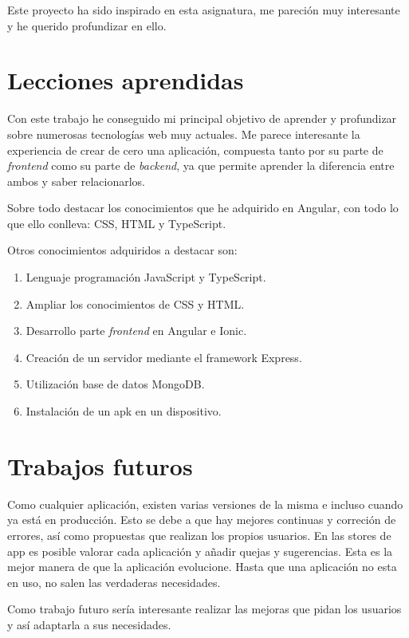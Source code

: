 \documentclass[a4paper, 12pt]{book}
\begin{document}
Este proyecto ha sido inspirado en esta asignatura, me pareci\'on muy interesante y he querido profundizar en ello.


\section{Lecciones aprendidas}
\label{sec:lecciones_aprendidas}

Con este trabajo he conseguido mi principal objetivo de aprender y profundizar sobre numerosas tecnolog\'ias web muy actuales. Me parece interesante la experiencia de crear de cero una aplicaci\'on, compuesta tanto por su parte de \emph{frontend} como su parte de \emph{backend}, ya que permite aprender la diferencia entre ambos y saber relacionarlos.

Sobre todo destacar los conocimientos que he adquirido en Angular, con todo lo que ello conlleva: CSS, HTML y TypeScript.

Otros conocimientos adquiridos a destacar son:

\begin{enumerate}
  \item Lenguaje programaci\'on JavaScript y TypeScript.
  \item Ampliar los conocimientos de CSS y HTML.
  \item Desarrollo parte \emph{frontend} en Angular e Ionic.
  \item Creaci\'on de un servidor mediante el framework Express.
  \item Utilizaci\'on base de datos MongoDB.
  \item Instalaci\'on de un apk en un dispositivo.
\end{enumerate}



\section{Trabajos futuros}
\label{sec:trabajos_futuros}

Como cualquier aplicaci\'on, existen varias versiones de la misma e incluso cuando ya est\'a en producci\'on. Esto se debe a que hay mejores continuas y correci\'on de errores, as\'i como propuestas que realizan los propios usuarios. En las stores de app es posible valorar cada aplicaci\'on y a\~nadir quejas y sugerencias. Esta es la mejor manera de que la aplicaci\'on evolucione. Hasta que una aplicaci\'on no esta en uso, no salen las verdaderas necesidades.

Como trabajo futuro ser\'ia interesante realizar las mejoras que pidan los usuarios y as\'i adaptarla a sus necesidades.
\end{document}
